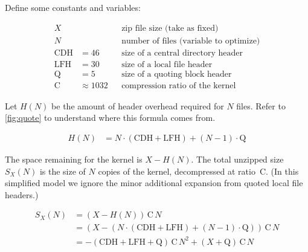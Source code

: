 \documentclass[letterpaper,twocolumn,10pt]{article}
\newcommand{\CDH}{\mathrm{CDH}}
\newcommand{\LFH}{\mathrm{LFH}}
\newcommand{\Q}{\mathrm{Q}}
\newcommand{\C}{\mathrm{C}}
\begin{document}
Define some constants and variables:

\begin{align*}
X & & & \mbox{zip file size (take as fixed)} \\
N & & & \mbox{number of files (variable to optimize)} \\
\CDH &= \num{46} & & \mbox{size of a central directory header} \\
\LFH &= \num{30} & & \mbox{size of a local file header} \\
\Q   &=  \num{5} & & \mbox{size of a quoting block header} \\
\C   &\approx \num{1032} & & \mbox{compression ratio of the kernel}
\end{align*}

% 
% 
% 
% 
% 
% 
% 
% 
% 
% 
% 
% 
% 
% 

Let $H(N)$
be the amount of header overhead required for $N$ files.
Refer to \autoref{fig:quote}
to understand where this formula comes from.

\begin{align*}
H(N) &= N\cdot(\CDH + \LFH) + (N - 1)\cdot\Q
\end{align*}

The space remaining for the kernel is
$X - H(N)$.
The total unzipped size
$S_X(N)$
is the size of $N$ copies
of the kernel,
decompressed at ratio~$\C$.
(In this simplified model we ignore
the minor additional expansion from quoted local file headers.)

\begin{align*}
S_X(N) &= (X - H(N)) \, \C \, N \\
       &= (X - (N \cdot (\CDH + \LFH) + (N - 1)\cdot\Q)) \, \C \, N \\
       &= -(\CDH + \LFH + \Q) \, \C \, N^2 + (X + \Q) \, \C \, N
\end{align*}
\end{document}
